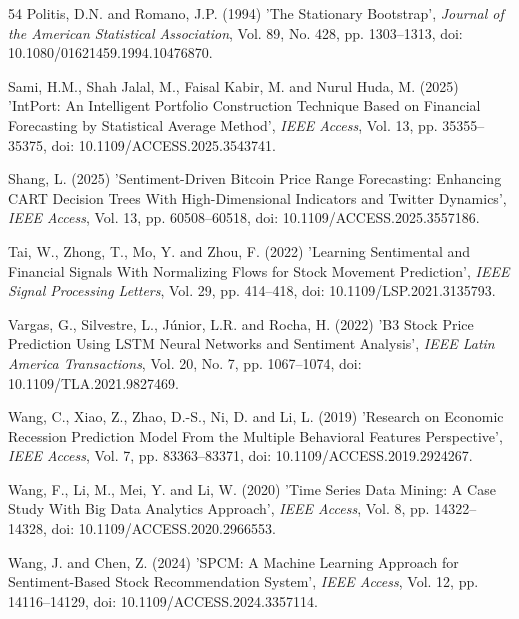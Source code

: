 \documentclass{singlecol-new}
\theoremstyle{TH}{
\newtheorem{lemma}{Lemma}
\newtheorem{theorem}[lemma]{Theorem}
\newtheorem{corrolary}[lemma]{Corrolary}
\newtheorem{conjecture}[lemma]{Conjecture}
\newtheorem{proposition}[lemma]{Proposition}
\newtheorem{claim}[lemma]{Claim}
\newtheorem{stheorem}[lemma]{Wrong Theorem}
\newtheorem{algorithm}{Algorithm}
}
\theoremstyle{THrm}{
\newtheorem{definition}{Definition}[section]
\newtheorem{question}{Question}[section]
\newtheorem{remark}{Remark}
\newtheorem{scheme}{Scheme}
}
\theoremstyle{THhit}{
\newtheorem{case}{Case}[section]
}
\begin{document}
\begin{thebibliography}{54}
Politis, D.N. and Romano, J.P. (1994) 'The Stationary Bootstrap', {\it Journal of the American Statistical Association}, Vol. 89, No. 428, pp. 1303--1313, doi: 10.1080/01621459.1994.10476870.

Sami, H.M., Shah Jalal, M., Faisal Kabir, M. and Nurul Huda, M. (2025) 'IntPort: An Intelligent Portfolio Construction Technique Based on Financial Forecasting by Statistical Average Method', {\it IEEE Access}, Vol. 13, pp. 35355--35375, doi: 10.1109/ACCESS.2025.3543741.

Shang, L. (2025) 'Sentiment-Driven Bitcoin Price Range Forecasting: Enhancing CART Decision Trees With High-Dimensional Indicators and Twitter Dynamics', {\it IEEE Access}, Vol. 13, pp. 60508--60518, doi: 10.1109/ACCESS.2025.3557186.

Tai, W., Zhong, T., Mo, Y. and Zhou, F. (2022) 'Learning Sentimental and Financial Signals With Normalizing Flows for Stock Movement Prediction', {\it IEEE Signal Processing Letters}, Vol. 29, pp. 414--418, doi: 10.1109/LSP.2021.3135793.

Vargas, G., Silvestre, L., J\'unior, L.R. and Rocha, H. (2022) 'B3 Stock Price Prediction Using LSTM Neural Networks and Sentiment Analysis', {\it IEEE Latin America Transactions}, Vol. 20, No. 7, pp. 1067--1074, doi: 10.1109/TLA.2021.9827469.

Wang, C., Xiao, Z., Zhao, D.-S., Ni, D. and Li, L. (2019) 'Research on Economic Recession Prediction Model From the Multiple Behavioral Features Perspective', {\it IEEE Access}, Vol. 7, pp. 83363--83371, doi: 10.1109/ACCESS.2019.2924267.

Wang, F., Li, M., Mei, Y. and Li, W. (2020) 'Time Series Data Mining: A Case Study With Big Data Analytics Approach', {\it IEEE Access}, Vol. 8, pp. 14322--14328, doi: 10.1109/ACCESS.2020.2966553.

Wang, J. and Chen, Z. (2024) 'SPCM: A Machine Learning Approach for Sentiment-Based Stock Recommendation System', {\it IEEE Access}, Vol. 12, pp. 14116--14129, doi: 10.1109/ACCESS.2024.3357114.


\end{thebibliography}
\end{document}
